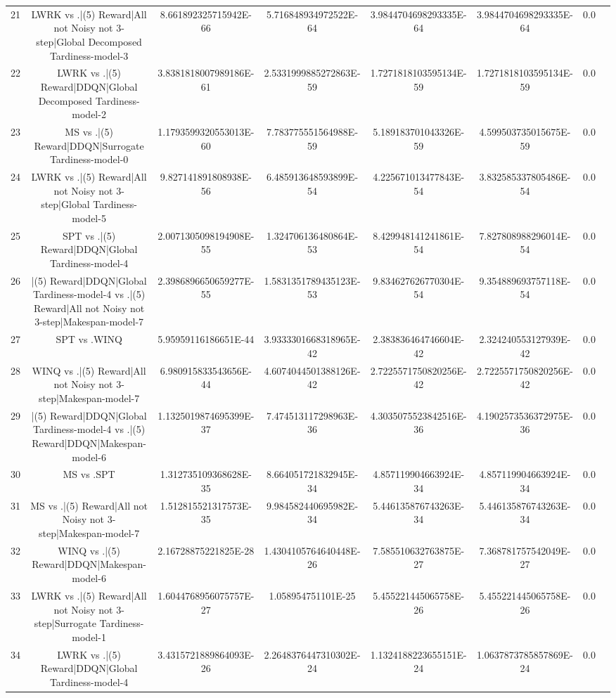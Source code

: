 \documentclass[a3paper,10pt]{article}
\begin{document}
\begin{table}[!htp]
\begin{tabular}{cccccccc}
21&LWRK vs .|(5) Reward|All not Noisy not 3-step|Global Decomposed Tardiness-model-3&8.661892325715942E-66&5.716848934972522E-64&3.9844704698293335E-64&3.9844704698293335E-64&0.0\\
22&LWRK vs .|(5) Reward|DDQN|Global Decomposed Tardiness-model-2&3.8381818007989186E-61&2.5331999885272863E-59&1.7271818103595134E-59&1.7271818103595134E-59&0.0\\
23&MS vs .|(5) Reward|DDQN|Surrogate Tardiness-model-0&1.1793599320553013E-60&7.783775551564988E-59&5.189183701043326E-59&4.599503735015675E-59&0.0\\
24&LWRK vs .|(5) Reward|All not Noisy not 3-step|Global Tardiness-model-5&9.827141891808938E-56&6.485913648593899E-54&4.225671013477843E-54&3.832585337805486E-54&0.0\\
25&SPT vs .|(5) Reward|DDQN|Global Tardiness-model-4&2.0071305098194908E-55&1.324706136480864E-53&8.429948141241861E-54&7.827808988296014E-54&0.0\\
26&|(5) Reward|DDQN|Global Tardiness-model-4 vs .|(5) Reward|All not Noisy not 3-step|Makespan-model-7&2.3986896650659277E-55&1.5831351789435123E-53&9.834627626770304E-54&9.354889693757118E-54&0.0\\
27&SPT vs .WINQ&5.95959116186651E-44&3.9333301668318965E-42&2.383836464746604E-42&2.324240553127939E-42&0.0\\
28&WINQ vs .|(5) Reward|All not Noisy not 3-step|Makespan-model-7&6.980915833543656E-44&4.6074044501388126E-42&2.7225571750820256E-42&2.7225571750820256E-42&0.0\\
29&|(5) Reward|DDQN|Global Tardiness-model-4 vs .|(5) Reward|DDQN|Makespan-model-6&1.1325019874695399E-37&7.474513117298963E-36&4.3035075523842516E-36&4.1902573536372975E-36&0.0\\
30&MS vs .SPT&1.312735109368628E-35&8.664051721832945E-34&4.857119904663924E-34&4.857119904663924E-34&0.0\\
31&MS vs .|(5) Reward|All not Noisy not 3-step|Makespan-model-7&1.512815521317573E-35&9.984582440695982E-34&5.446135876743263E-34&5.446135876743263E-34&0.0\\
32&WINQ vs .|(5) Reward|DDQN|Makespan-model-6&2.16728875221825E-28&1.4304105764640448E-26&7.585510632763875E-27&7.368781757542049E-27&0.0\\
33&LWRK vs .|(5) Reward|All not Noisy not 3-step|Surrogate Tardiness-model-1&1.6044768956075757E-27&1.058954751101E-25&5.455221445065758E-26&5.455221445065758E-26&0.0\\
34&LWRK vs .|(5) Reward|DDQN|Global Tardiness-model-4&3.4315721889864093E-26&2.2648376447310302E-24&1.1324188223655151E-24&1.0637873785857869E-24&0.0\\

\end{tabular}
\end{table}
\end{document}
